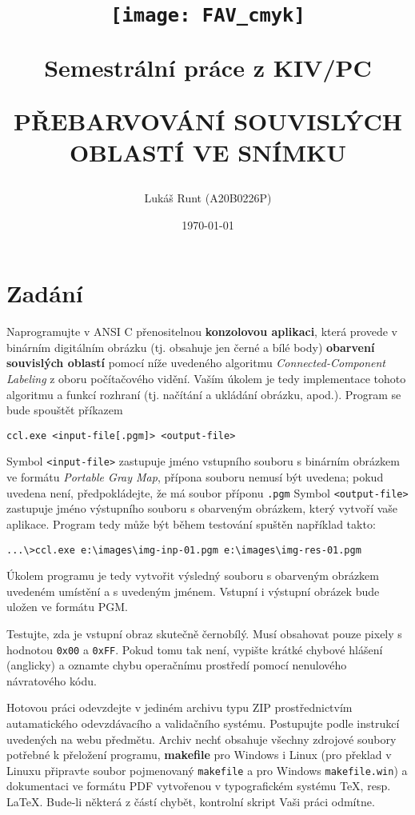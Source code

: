 \documentclass[12pt, a4paper]{article}
\title{\texttt{[image: FAV\_cmyk]}

{\huge Semestrální práce z KIV/PC}

\vspace{0.5cm}
{\LARGE PŘEBARVOVÁNÍ SOUVISLÝCH OBLASTÍ VE SNÍMKU}
\vspace{1cm}
}
\author{Lukáš Runt (A20B0226P)}
\date{\vspace{7.5cm} \today}
\begin{document}
\begin{titlepage}
\clearpage\maketitle
\thispagestyle{empty}
\end{titlepage}
\tableofcontents \newpage

\section{Zadání}
Naprogramujte v ANSI C přenositelnou {\bf konzolovou aplikaci}, která provede v binárním digitálním obrázku (tj. obsahuje jen černé a bílé body) {\bf obarvení souvislých oblastí} pomocí níže uvedeného algoritmu {\it Connected-Component Labeling} z oboru počítačového vidění. Vaším úkolem je tedy implementace tohoto algoritmu a funkcí rozhraní (tj. načítání a ukládání obrázku, apod.). Program se bude spouštět příkazem

\vspace{0.5cm}
\centerline{ \texttt{ccl.exe <input-file[.pgm]> <output-file>}}
\vspace{0.5cm}

\noindent Symbol \texttt{<input-file>} zastupuje jméno vstupního souboru s binárním obrázkem ve formátu {\it Portable Gray Map}, přípona souboru nemusí být uvedena; pokud uvedena není, předpokládejte, že má soubor příponu \texttt{.pgm} Symbol \texttt{<output-file>} zastupuje jméno výstupního souboru s obarveným obrázkem, který vytvoří vaše aplikace. Program tedy může být během testování spuštěn například takto:

\vspace{0.5cm}
{ \texttt{...\textbackslash>ccl.exe e:\textbackslash images\textbackslash img-inp-01.pgm e:\textbackslash images\textbackslash img-res-01.pgm}}
\vspace{0.5cm}

Úkolem programu je tedy vytvořit výsledný souboru s obarveným obrázkem uvedeném umístění a s uvedeným jménem. Vstupní i výstupní obrázek bude uložen ve formátu PGM. 

Testujte, zda je vstupní obraz skutečně černobílý. Musí obsahovat pouze pixely s hodnotou \texttt{0x00} a \texttt{0xFF}. Pokud tomu tak není, vypište krátké chybové hlášení (anglicky) a oznamte chybu operačnímu prostředí pomocí nenulového návratového kódu.

\vspace{0.5cm}
\noindent Hotovou práci odevzdejte v jediném archivu typu ZIP prostřednictvím autamatického odevzdávacího a validačního systému. Postupujte podle instrukcí uvedených na webu předmětu. Archiv nechť obsahuje všechny zdrojové soubory potřebné k přeložení programu, {\bf makefile} pro Windows i Linux (pro překlad v Linuxu připravte soubor pojmenovaný \texttt{makefile} a pro Windows \texttt{makefile.win}) a dokumentaci ve formátu PDF vytvořenou v typografickém systému \TeX, resp. \LaTeX. Bude-li některá z částí chybět, kontrolní skript Vaši práci odmítne.
\end{document}
